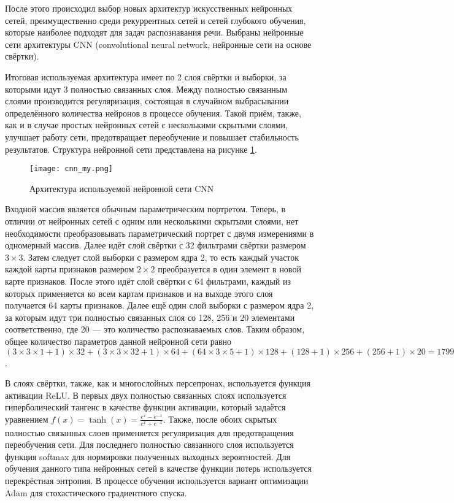 После этого происходил выбор новых архитектур искусственных нейронных сетей, преимущественно среди рекуррентных сетей и сетей глубокого обучения, которые наиболее подходят для задач распознавания речи.
Выбраны нейронные сети архитектуры CNN (convolutional neural network, нейронные сети на основе свёртки).

Итоговая используемая архитектура имеет по 2 слоя свёртки и выборки, за которыми идут 3 полностью связанных слоя.
Между полностью связанным слоями производится регуляризация, состоящая в случайном выбрасывании определённого количества нейронов в процессе обучения.
Такой приём, также, как и в случае простых нейронных сетей с несколькими скрытыми слоями, улучшает работу сети, предотвращает переобучение и повышает стабильность результатов.
Структура нейронной сети представлена на рисунке \ref{fig:cnn_my}.

\begin{figure}[h]
	\centering
	\texttt{[image: cnn\_my.png]}
	\caption{Архитектура используемой нейронной сети CNN}
	\label{fig:cnn_my}
\end{figure}

Входной массив является обычным параметрическим портретом.
Теперь, в отличии от нейронных сетей с одним или несколькими скрытыми слоями, нет необходимости преобразовывать параметрический портрет с двумя измерениями в одномерный массив.
Далее идёт слой свёртки с 32 фильтрами свёртки размером $3 \times 3$.
Затем следует слой выборки с размером ядра 2, то есть каждый участок каждой карты признаков размером $2 \times 2$ преобразуется в один элемент в новой карте признаков.
После этого идёт слой свёртки с 64 фильтрами, каждый из которых применяется ко всем картам признаков и на выходе этого слоя получается 64 карты признаков.
Далее ещё один слой выборки с размером ядра 2, за которым идут три полностью связанных слоя со 128, 256 и 20 элементами соответственно, где 20 --- это количество распознаваемых слов.
Таким образом, общее количество параметров данной нейронной сети равно $(3 \times 3 \times 1 + 1) \times 32 + (3 \times 3 \times 32 + 1)  \times 64 + (64 \times 3 \times 5 + 1) \times 128 + (128 + 1) \times 256 + (256 + 1) \times 20 = 179 988$.

В слоях свёртки, также, как и многослойных персепронах, используется функция активации ReLU.
В первых двух полностью связанных слоях используется гиперболический тангенс в качестве функции активации, который задаётся уравнением $f(x) = \tanh(x) = \frac{e^x - e^{-x}}{e^x + e^{-x}}$.
Также, после обоих скрытых полностью связанных слоев применяется регуляризация для предотвращения переобучения сети.
Для последнего полностью связанного слоя используется функция softmax для нормировки полученных выходных вероятностей.
Для обучения данного типа нейронных сетей в качестве функции потерь используется перекрёстная энтропия.
В процессе обучения используется вариант оптимизации Adam для стохастического градиентного спуска.

